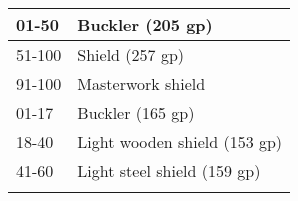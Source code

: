 \begin{longtable}{llll}
\hline
\multicolumn{3}{p{3.276in}|}{\begin{minipage}[t]{3.276in}\raggedright
01-50\end{minipage}} & \multicolumn{1}{|p{0.896in}|}{\begin{minipage}[t]{0.896in}\raggedright
Buckler (205 gp)\end{minipage}}\\
\hline
\multicolumn{3}{p{3.276in}|}{\begin{minipage}[t]{3.276in}\raggedright
51-100\end{minipage}} & \multicolumn{1}{|p{0.896in}|}{\begin{minipage}[t]{0.896in}\raggedright
Shield (257 gp)\end{minipage}}\\
\hline
\multicolumn{3}{p{3.276in}|}{\begin{minipage}[t]{3.276in}\raggedright
91-100\end{minipage}} & \multicolumn{1}{|p{0.896in}|}{\begin{minipage}[t]{0.896in}\raggedright
Masterwork shield\end{minipage}}\\
\hline
\multicolumn{3}{p{3.276in}|}{\begin{minipage}[t]{3.276in}\raggedright
01-17\end{minipage}} & \multicolumn{1}{|p{0.896in}|}{\begin{minipage}[t]{0.896in}\raggedright
Buckler (165 gp)\end{minipage}}\\
\hline
\multicolumn{3}{p{3.276in}|}{\begin{minipage}[t]{3.276in}\raggedright
18-40\end{minipage}} & \multicolumn{1}{|p{0.896in}|}{\begin{minipage}[t]{0.896in}\raggedright
Light wooden shield (153 gp)\end{minipage}}\\
\hline
\multicolumn{3}{p{3.276in}|}{\begin{minipage}[t]{3.276in}\raggedright
41-60\end{minipage}} & \multicolumn{1}{|p{0.896in}|}{\begin{minipage}[t]{0.896in}\raggedright
Light steel shield (159 gp)\end{minipage}}\\
\hline
\multicolumn{3}{p{3.276in}|}{\begin{minipage}[t]{3.276in}\raggedright

\end{minipage}}
\end{longtable}
